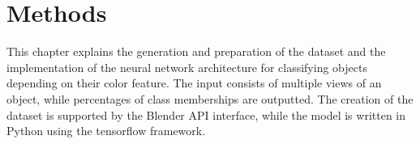 \chapter{Methods}
\label{sec:methods}
This chapter explains the generation and preparation of the dataset and the implementation of the neural network architecture for classifying objects depending on their color feature.
The input consists of multiple views of an object, while percentages of class memberships are outputted.
The creation of the dataset is supported by the Blender API interface, while the model is written in Python using the tensorflow framework.





